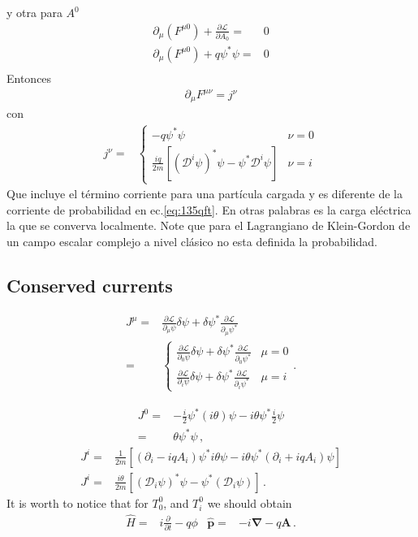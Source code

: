y otra para $A^0$
\begin{align}
    \partial_\mu(F^{\mu0})+\frac{\partial\mathcal{L}}{\partial A_0}=&0\nonumber\\
    \partial_\mu(F^{\mu0})+q \psi^*\psi =&0\nonumber\\
\end{align}
Entonces
\begin{align*}
\partial_\mu F^{\mu\nu}=j^\nu
\end{align*}
con
\begin{align*}
  j^\nu=&
  \begin{cases}
    -q \psi^*\psi &\nu=0\\
    \frac{i q}{2m}[ (\mathcal{D}^i\psi)^*\psi -\psi^*\mathcal{D}^i\psi ]&\nu=i
  \end{cases}
\end{align*}
Que incluye el término corriente para una partícula cargada y es diferente de la corriente de probabilidad en ec.\eqref{eq:135qft}. En otras palabras es la carga eléctrica la que se converva localmente. Note que para el Lagrangiano de Klein-Gordon de un campo escalar complejo a nivel clásico no esta definida la probabilidad. 

\subsection{Conserved currents}


\begin{align}
  J^\mu=&\frac{\partial\mathcal{L}}{\partial_\mu\psi}\delta\psi+\delta\psi^*\frac{\partial\mathcal{L}}{\partial_\mu\psi^*}\nonumber\\
=&\begin{cases}
  \frac{\partial\mathcal{L}}{\partial_0\psi}\delta\psi+\delta\psi^*\frac{\partial\mathcal{L}}{\partial_0\psi^*}&\mu=0\\
  \frac{\partial\mathcal{L}}{\partial_i\psi}\delta\psi+\delta\psi^*\frac{\partial\mathcal{L}}{\partial_i\psi^*}&\mu=i
\end{cases}.
\end{align}

\begin{align}
  J^0=&-\frac{i}{2}\psi^*(i\theta)\psi-i\theta\psi^*\frac{i}{2}\psi\nonumber\\
  =&\theta\psi^*\psi\,,
\end{align}
\begin{align}
  J^i=&\frac{1}{2m}\left[\left(\partial_i-iqA_i\right)\psi^*i\theta\psi-i\theta\psi^*\left(\partial_i+iqA_i\right)\psi\right]\nonumber\\
  J^i=&\frac{i\theta}{2m}\left[\left(\mathcal{D}_i\psi\right)^*\psi-\psi^*\left(\mathcal{D}_i\psi\right)\right]\,.
  \end{align}
It is worth to notice that for $T^0_0$, and $T^0_i$ we should obtain
\begin{align}
  \widehat{H}=& i\frac{\partial}{\partial t}-q\phi & \widehat{\mathbf{p}}=&-i\boldsymbol{\nabla}-q\mathbf{A}\,.
\end{align}


